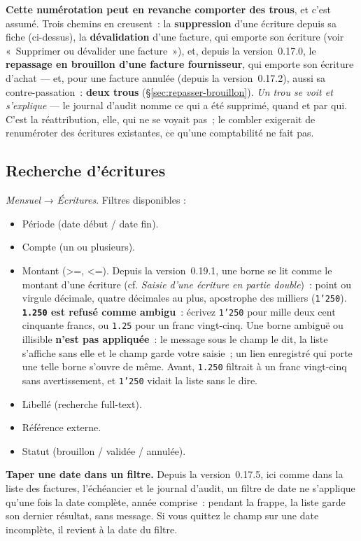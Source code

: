 \documentclass[a4paper,11pt,oneside]{article}
\begin{document}
\textbf{Cette numérotation peut en revanche comporter des trous}, et c'est assumé. Trois chemins
en creusent~: la \textbf{suppression} d'une écriture depuis sa fiche (ci-dessus), la
\textbf{dévalidation} d'une facture, qui emporte son écriture (voir «~Supprimer ou dévalider une
facture~»), et, depuis la version~0.17.0, le \textbf{repassage en brouillon d'une facture
fournisseur}, qui emporte son écriture d'achat --- et, pour une facture annulée (depuis la
version~0.17.2), aussi sa contre-passation~: \textbf{deux trous} (\S\ref{sec:repasser-brouillon}). \emph{Un trou se voit et s'explique} --- le journal d'audit nomme ce qui a été
supprimé, quand et par qui. C'est la réattribution, elle, qui ne se voyait pas~; le combler
exigerait de renuméroter des écritures existantes, ce qu'une comptabilité ne fait pas.

\subsection{Recherche d'écritures}

\emph{Mensuel} → \emph{Écritures}. Filtres disponibles :

\begin{itemize}
    \item Période (date début / date fin).
    \item Compte (un ou plusieurs).
    \item Montant (>=, <=). Depuis la version~0.19.1, une borne se lit comme le montant d'une écriture (cf. \emph{Saisie d'une écriture en partie double})~: point ou virgule décimale, quatre décimales au plus, apostrophe des milliers (\texttt{1'250}). \textbf{\texttt{1.250} est refusé comme ambigu}~: écrivez \texttt{1'250} pour mille deux cent cinquante francs, ou \texttt{1.25} pour un franc vingt-cinq. Une borne ambiguë ou illisible \textbf{n'est pas appliquée}~: le message sous le champ le dit, la liste s'affiche sans elle et le champ garde votre saisie~; un lien enregistré qui porte une telle borne s'ouvre de même. Avant, \texttt{1.250} filtrait à un franc vingt-cinq sans avertissement, et \texttt{1'250} vidait la liste sans le dire.
    \item Libellé (recherche full-text).
    \item Référence externe.
    \item Statut (brouillon / validée / annulée).
\end{itemize}

\textbf{Taper une date dans un filtre.} Depuis la version~0.17.5, ici comme dans la liste des
factures, l'échéancier et le journal d'audit, un filtre de date ne s'applique qu'une fois la date
complète, année comprise~: pendant la frappe, la liste garde son
dernier résultat, sans message. Si vous quittez le champ sur une date incomplète, il revient à la
date du filtre.
\end{document}
